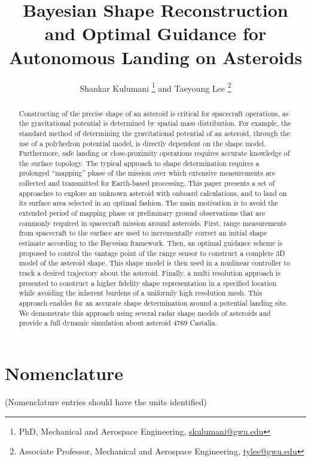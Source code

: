 \documentclass[journal]{new-aiaa}
\title{Bayesian Shape Reconstruction and Optimal Guidance for Autonomous Landing on Asteroids}
\author{Shankar Kulumani \footnote{PhD, Mechanical and Aerospace Engineering, \href{mailto:skulumani@gwu.edu}{skulumani@gwu.edu}}
and
Taeyoung Lee \footnote{Associate Professor, Mechanical and Aerospace Engineering, \href{mailto:tylee@gwu.edu}{tylee@gwu.edu}}}
\affil{The George Washington University, Washington, DC, 20052}
\begin{document}
\maketitle

\begin{abstract}
    Constructing of the precise shape of an asteroid is critical for spacecraft operations, as the gravitational potential is determined by spatial mass distribution.
    For example, the standard method of determining the gravitational potential of an asteroid, through the use of a polyhedron potential model, is directly dependent on the shape model.
    Furthermore, safe landing or close-proximity operations requires accurate knowledge of the surface topology. 
    The typical approach to shape determination requires a prolonged ``mapping'' phase of the mission over which extensive measurements are collected and transmitted for Earth-based processing.
    This paper presents a set of approaches to explore an unknown asteroid with onboard calculations, and to land on its surface area selected in an optimal fashion. 
    The main motivation is to avoid the extended period of mapping phase or preliminary ground observations that are commonly required in spacecraft mission around asteroids. 
    First, range measurements from spacecraft to the surface are used to incrementally correct an initial shape estimate according to the Bayesian framework. 
    Then, an optimal guidance scheme is proposed to control the vantage point of the range sensor to construct a complete 3D model of the asteroid shape. 
    This shape model is then used in a nonlinear controller to track a desired trajectory about the asteroid.
    Finally, a multi resolution approach is presented to construct a higher fidelity shape representation in a specified location while avoiding the inherent burdens of a uniformly high resolution mesh. 
    This approach enables for an accurate shape determination around a potential landing site.
    We demonstrate this approach using several radar shape models of asteroids and provide a full dynamic simulation about asteroid 4769 Castalia.
\end{abstract}

\section*{Nomenclature}

\noindent(Nomenclature entries should have the units identified)
\end{document}
